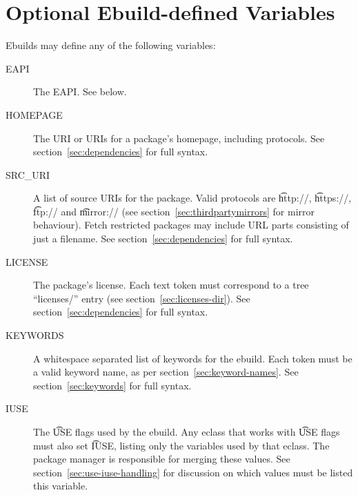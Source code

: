 \section{Optional Ebuild-defined Variables}

Ebuilds may define any of the following variables:

\begin{description}
\item[EAPI] The EAPI\@. See below.
\item[HOMEPAGE] The URI or URIs for a package's homepage, including protocols.
    See section~\ref{sec:dependencies} for full syntax.
\item[SRC\_URI] A list of source URIs for the package. Valid protocols are \t{http://},
    \t{https://}, \t{ftp://} and \t{mirror://} (see section~\ref{sec:thirdpartymirrors} for mirror
    behaviour). Fetch restricted packages may include URL parts consisting of just a filename.
    See section~\ref{sec:dependencies} for full syntax.
\item[LICENSE] The package's license. Each text token must correspond to a tree ``licenses/'' entry
    (see section~\ref{sec:licenses-dir}). See section~\ref{sec:dependencies} for full syntax.
    \label{ebuild-var-LICENSE}
\item[KEYWORDS] A whitespace separated list of keywords for the ebuild. Each token must be a valid
    keyword name, as per section~\ref{sec:keyword-names}. See section~\ref{sec:keywords} for full
    syntax.
\item[IUSE] The \t{USE} flags used by the ebuild. Any eclass that works with \t{USE} flags must
    also set \t{IUSE}, listing only the variables used by that eclass. The package manager is
    responsible for merging these values. See section~\ref{sec:use-iuse-handling} for discussion on
    which values must be listed this variable.


\end{description}
